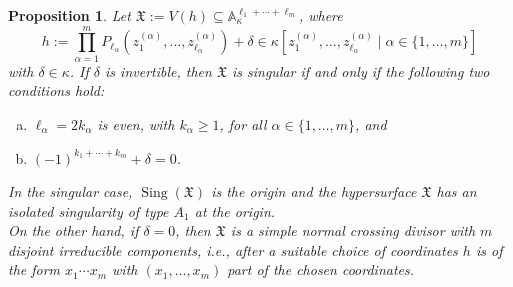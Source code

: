\documentclass[letter,11pt]{amsart}
\renewcommand{\AA}{\ensuremath{\mathbb{A}}}
\DeclareMathOperator{\Sing}{Sing}
\theoremstyle{theorem}
\newtheorem{prop}[Thm]{Proposition}
\theoremstyle{definition}
\newcommand{\len}{\ell}
\newcommand{\halflen}{k}
\numberwithin{equation}{section}
\begin{document}
\begin{prop}
	\label{Prop:ProdContSing}
	Let $ \mathfrak{X} := V(h) \subseteq \AA_\kappa^{\len_1+\cdots + \len_m} $,
	where
	\[
		h := \prod_{\alpha=1}^m P_{\len_\alpha} (z_1^{(\alpha)}, \ldots, z_{\len_\alpha}^{(\alpha)}) + \delta 
		\in \kappa [ z_1^{(\alpha)}, \ldots, z_{\len_\alpha}^{(\alpha)} \mid \alpha \in \{ 1, \ldots, m \}]
	\]
	with 
	$ \delta \in \kappa $. 
	If $ \delta $ is invertible, 
	then $ \mathfrak{X} $ is singular if and only if the following two conditions hold:
	\begin{enumerate}[(a)]
		\item[(a)] 
		$ \len_\alpha = 2 \halflen_\alpha $ is even, 
		with $  \halflen_\alpha \geq 1 $,
		for all $ \alpha \in \{ 1, \ldots, m \} $, and 
		
		\item[(b)] 
		$ (-1)^{\halflen_1 + \cdots + \halflen_m} + \delta  = 0 $.
	\end{enumerate}
	In the singular case, $ \Sing (\mathfrak{X}) $ is the origin and the hypersurface $ \mathfrak{X} $ has an isolated singularity of type $ A_1 $ at the origin. 
	\\
	On the other hand, if $ \delta = 0 $, then 
	$ \mathfrak{X} $ is a simple normal crossing divisor with $ m $ disjoint irreducible components, 
	i.e., after a suitable choice of coordinates $ h $ is of the form $ x_1 \cdots x_m $ with $ (x_1, \ldots, x_m) $ part of the chosen coordinates. 
\end{prop}
\end{document}

